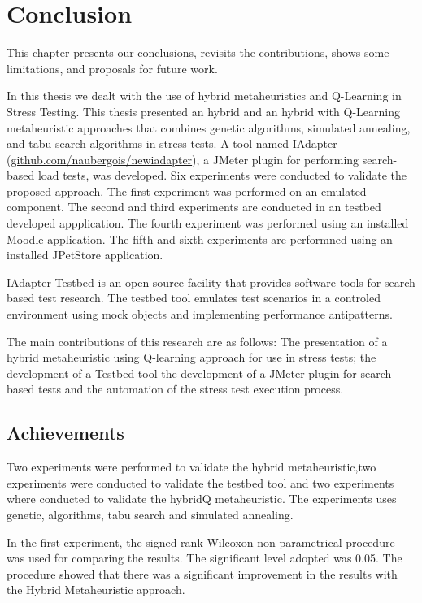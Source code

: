 \documentclass[espaco=umemeio,chapter=TITLE,twoside,openright]{abnt}
\begin{document}
\chapter{Conclusion}

This chapter presents our conclusions, revisits the contributions, shows some limitations, and proposals for future work.

In this thesis we dealt with the use of hybrid metaheuristics and Q-Learning in Stress Testing. This thesis presented an hybrid and an hybrid with Q-Learning metaheuristic approaches that combines genetic algorithms, simulated annealing, and tabu search algorithms in stress tests. A tool named IAdapter (\url{github.com/naubergois/newiadapter}), a JMeter plugin for performing search-based load tests, was developed. Six experiments were conducted to validate the proposed approach. The first experiment was performed on an emulated component. The second and third experiments are conducted in an testbed developed appplication. The fourth  experiment was performed using an installed Moodle application. The fifth and sixth experiments are performned using an installed JPetStore application.

IAdapter Testbed is an open-source facility that provides software tools for search based test research. The testbed tool emulates test scenarios in a controled environment using mock objects and implementing performance antipatterns.

The main contributions of this research are as follows: The presentation of a hybrid metaheuristic using Q-learning  approach for use in stress tests; the development of a Testbed tool the development of a JMeter plugin  for search-based tests and  the automation of the stress test execution process.

\section{Achievements}

Two experiments were performed to validate the hybrid metaheuristic,two experiments were conducted to validate the testbed tool and two experiments where conducted to validate the hybridQ metaheuristic. The experiments uses genetic, algorithms, tabu search and simulated annealing.

In the first experiment, the signed-rank Wilcoxon non-parametrical procedure was used for comparing the results. The significant level adopted was 0.05. The procedure showed that there was a significant improvement in the results with the Hybrid Metaheuristic approach.
\end{document}
